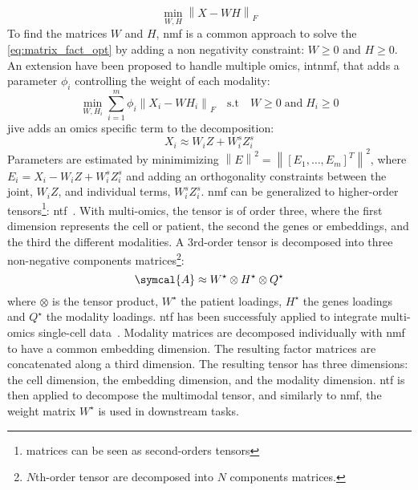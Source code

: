 \documentclass[../main.tex]{subfiles}
\begin{document}
		\begin{equation}
			\min_{W,H} {\left\| X - WH \right\|}_{F} \label{eq:matrix_fact_opt}
		\end{equation}
		To find the matrices \(W\) and \(H\), \gls{nmf} is a common approach to solve the \cref{eq:matrix_fact_opt} by adding a non negativity constraint: \(W \geq 0\) and \(H \geq 0\).
		An extension have been proposed to handle multiple omics, \gls{intnmf}, that adds a parameter \(\phi_{i}\) controlling the weight of each modality:
		\begin{equation}
			\min_{W,H_i} \sum_{i=1}^{m} \phi_{i}{\left\| X_i - WH_i \right\|}_{F} \quad \text{s.t} \quad W \geq 0 \;\text{and}\; H_i \geq 0
		\end{equation}
		\Gls{jive} adds an omics specific term to the decomposition:
		\begin{equation}
			X_i \approx W_i Z + W_i^s Z_i^s
		\end{equation}
		Parameters are estimated by minimimizing \({\left\|E\right\|}^2 = {\left\|{\left[E_1, \ldots, E_m \right]}^T\right\|}^2\), where \(E_i = X_i - W_i Z + W_i^s Z_i^s\) and adding an orthogonality constraints between the joint, \(W_i Z\), and individual terms, \( W_i^s Z_i^s\).
		\Gls{nmf} can be generalized to higher-order tensors\footnote{matrices can be seen as second-orders tensors}: \gls{ntf}~\cite{Cichocki2009}.
		With multi-omics, the tensor is of order three, where the first dimension represents the cell or patient, the second the genes or embeddings, and the third the different modalities.
		A 3rd-order tensor is decomposed into three non-negative components matrices\footnote{\(N\)th-order tensor are decomposed into \(N\) components matrices.}:
		\begin{equation}
			\symcal{A} \approx W^{\star}\otimes H^{\star} \otimes Q^{\star}
		\end{equation}
		where \(\otimes\) is the tensor product, \(W^{\star}\) the patient loadings, \(H^{\star}\) the genes loadings and \(Q^{\star}\) the modality loadings.
		\Gls{ntf} has been successfuly applied to integrate multi-omics single-cell data~\cite{Fogel2024}.
		Modality matrices are decomposed individually with \gls{nmf} to have a common embedding dimension.
		The resulting factor matrices are concatenated along a third dimension.
		The resulting tensor has three dimensions: the cell dimension, the embedding dimension, and the modality dimension.
		\Gls{ntf} is then applied to decompose the multimodal tensor, and similarly to \gls{nmf}, the weight matrix \(W^{\star}\) is used in downstream tasks.
\end{document}
